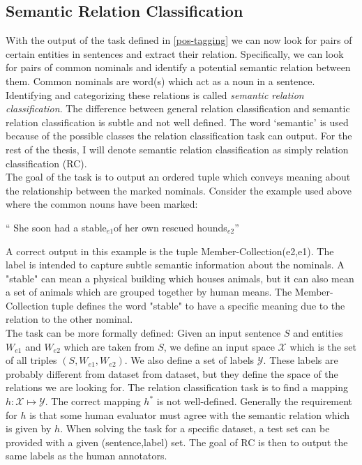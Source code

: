 \subsection{Semantic Relation Classification}
\label{define_rc}
With the output of the task defined in \ref{pos-tagging} we can now look for pairs of certain entities in sentences and extract their relation. Specifically, we can look for pairs of common nominals and identify a potential semantic relation between them. Common nominals are word(s) which act as a noun in a sentence. Identifying and categorizing these relations is called \emph{semantic relation classification}. The difference between general relation classification and semantic relation classification is subtle and not well defined. The word `semantic' is used because of the possible classes the relation classification task can output\cite{semeval2007}\cite{semeval2010}. For the rest of the thesis, I will denote semantic relation classification as simply relation classification (RC). \\
The goal of the task is to output an ordered tuple which conveys meaning about the relationship between the marked nominals.
Consider the example used above where the common nouns have been marked:

\begin{center}
`` She soon had a stable$_{e1}$of her own rescued hounds$_{e2}$''
\end{center}

A correct output in this example is the tuple Member-Collection(e2,e1). The label is intended to capture subtle semantic information about the nominals. A "stable" can mean a physical building which houses animals, but it can also mean a set of animals which are grouped together by human means. The Member-Collection tuple defines the word "stable" to have a specific meaning due to the relation to the other nominal.\\

The task can be more formally defined:
Given an input sentence $S$ and entities $W_{e1}$ and $W_{e2}$ which are taken from $S$, we define an input space $\mathcal{X}$ which is the set of all triples $(S,W_{e1},W_{e2})$. %
We also define a set of labels $\mathcal{Y}$. These labels are probably different from dataset from dataset, but they define the space of the relations we are looking for. The relation classification task is to find a mapping $h:\mathcal{X} \mapsto \mathcal{Y}$. The correct mapping $h^*$ is not well-defined. Generally the requirement for $h$ is that some human evaluator must agree with the semantic relation which is given by $h$. When solving the task for a specific dataset, a test set can be provided with a given (sentence,label) set. The goal of RC is then to output the same labels as the human annotators.

